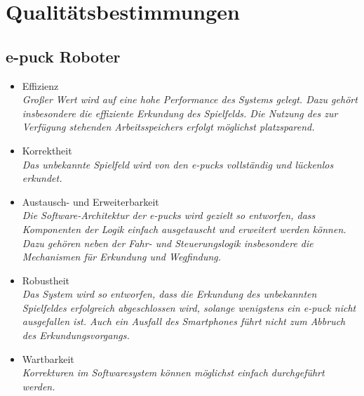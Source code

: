 \documentclass[10pt,a4paper]{article}
\let\oldsection\section
\renewcommand{\section}{\newpage \oldsection}
\begin{document}
	\section{Qualitätsbestimmungen}
		
		\subsection{e-puck Roboter}
			\begin{itemize}
				\item Effizienz
					\\ \textsl{Großer Wert wird auf eine hohe Performance des Systems gelegt. Dazu gehört insbesondere die effiziente Erkundung
						des Spielfelds. Die Nutzung des zur Verfügung stehenden Arbeitsspeichers erfolgt möglichst platzsparend.}
				\item Korrektheit
					\\ \textsl{Das unbekannte Spielfeld wird von den e-pucks vollständig und lückenlos erkundet.}
				\item Austausch- und Erweiterbarkeit
					\\ \textsl{Die Software-Architektur der e-pucks wird gezielt so entworfen, dass Komponenten der Logik einfach ausgetauscht
						und erweitert werden können.
						Dazu gehören neben der Fahr- und Steuerungslogik insbesondere die Mechanismen für Erkundung und Wegfindung.}	
				\item Robustheit 
					\\ \textsl{Das System wird so entworfen, dass die Erkundung des unbekannten Spielfeldes erfolgreich abgeschlossen
						wird, solange wenigstens ein e-puck nicht ausgefallen ist.
						Auch ein Ausfall des Smartphones führt nicht zum Abbruch des Erkundungsvorgangs.	}	
				\item Wartbarkeit
					\\ \textsl{Korrekturen im Softwaresystem können möglichst einfach durchgeführt werden.}				
			\end{itemize}		
		
\end{document}
